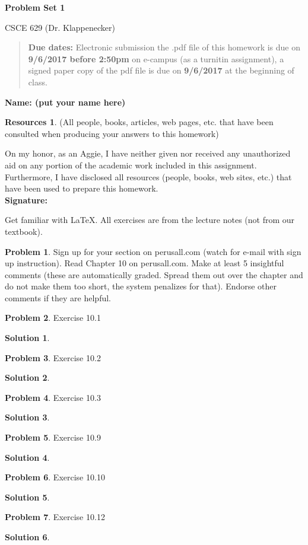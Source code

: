 \documentclass{article}
\theoremstyle{definition}
\newtheorem{problem}{Problem}
\newtheorem*{solution}{Solution}
\newtheorem*{resources}{Resources}
\newcommand{\name}[1]{\noindent\textbf{Name: #1}}
\newcommand{\honor}{\noindent On my honor, as an Aggie, I have neither
  given nor received any unauthorized aid on any portion of the
  academic work included in this assignment. Furthermore, I have
  disclosed all resources (people, books, web sites, etc.) that have
  been used to prepare this homework. \\[1ex]
 \textbf{Signature:} \underline{\hspace*{5cm}} }
\newcommand{\problemset}[1]{\begin{center}\textbf{Problem Set #1}\end{center}}
\newcommand{\duedate}[2]{\begin{quote}\textbf{Due dates:} Electronic
    submission the .pdf file of this homework is due on \textbf{#1} on e-campus
    (as a turnitin assignment), a signed paper copy
    of the pdf file is due on \textbf{#2} at the beginning of
    class. \end{quote} }
\begin{document}
\problemset{1}
\centerline{CSCE 629 (Dr. Klappenecker) }

\duedate{9/6/2017 before 2:50pm}{9/6/2017}
\name{ (put your name here)}
\begin{resources} (All people, books, articles, web pages, etc. that
  have been consulted when producing your answers to this homework)
\end{resources}
\honor

\newpage%
\noindent Get familiar with \LaTeX. All exercises are from the lecture notes
(not from our textbook). \medskip

\begin{problem}
Sign up for your section on perusall.com (watch for e-mail with sign
up instruction). Read Chapter 10 on perusall.com. Make at least 5
insightful comments (these are automatically graded. Spread them out
over the chapter and do not make them too short, the system penalizes
for that). Endorse other comments if they are helpful. 
\end{problem}

\begin{problem}
Exercise 10.1
\begin{solution}
\end{solution}
\end{problem}

\begin{problem}
Exercise 10.2
\begin{solution}
\end{solution}
\end{problem}

\begin{problem}
Exercise 10.3
\begin{solution}
\end{solution}
\end{problem}

\begin{problem}
Exercise 10.9
\begin{solution}
\end{solution}
\end{problem}

\begin{problem}
Exercise 10.10 
\begin{solution}
\end{solution}
\end{problem}

\begin{problem}
Exercise 10.12
\begin{solution}
\end{solution}
\end{problem}
\end{document}

